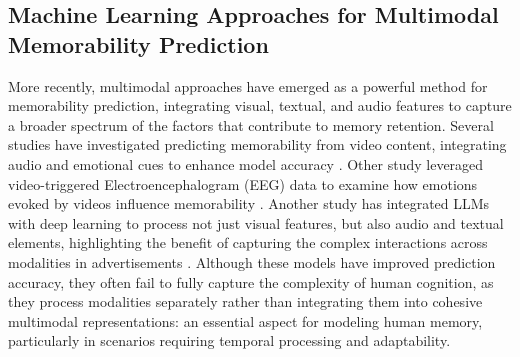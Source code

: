 \subsection{Machine Learning Approaches for Multimodal Memorability Prediction}
More recently, multimodal approaches have emerged as a powerful method for memorability prediction, integrating visual, textual, and audio features to capture a broader spectrum of the factors that contribute to memory retention. Several studies have investigated predicting memorability from video content, integrating audio and emotional cues to enhance model accuracy \cite{dudzik2020investigating}. Other study leveraged video-triggered Electroencephalogram (EEG) data to examine how emotions evoked by videos influence memorability \cite{hu2020video}. Another study has integrated LLMs with deep learning to process not just visual features, but also audio and textual elements, highlighting the benefit of capturing the complex interactions across modalities in advertisements \cite{harinilong}. Although these models have improved prediction accuracy, they often fail to fully capture the complexity of human cognition, as they process modalities separately rather than integrating them into cohesive multimodal representations: an essential aspect for modeling human memory, particularly in scenarios requiring temporal processing and adaptability.